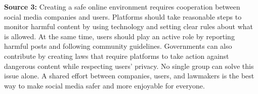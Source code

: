 \documentclass[12pt]{article}
\begin{document}
\begin{tcolorbox}[colframe=black!60, colback=white, 
coltitle=black, colbacktitle=black!15, fonttitle=\bfseries\Large, 
title=Independent Practice, halign title=center, left=10pt, right=10pt, top=10pt, bottom=15pt]
\vspace{1em}

\textbf{Source 3: }Creating a safe online environment requires cooperation between social media companies and users. Platforms should take reasonable steps to monitor harmful content by using technology and setting clear rules about what is allowed. At the same time, users should play an active role by reporting harmful posts and following community guidelines. Governments can also contribute by creating laws that require platforms to take action against dangerous content while respecting users’ privacy. No single group can solve this issue alone. A shared effort between companies, users, and lawmakers is the best way to make social media safer and more enjoyable for everyone. 


\end{tcolorbox}
\end{document}
